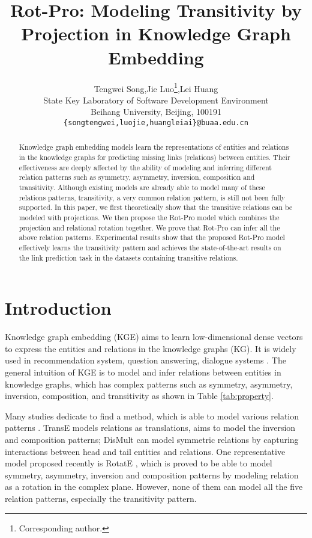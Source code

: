 \documentclass{article}
\title{Rot-Pro: Modeling Transitivity by Projection in Knowledge Graph Embedding}
\author{
  Tengwei Song,\quad Jie Luo\thanks{Corresponding author.},\quad Lei Huang\\
  State Key Laboratory of Software Development Environment \\
  Beihang University, Beijing, 100191 \\
  \texttt{\{songtengwei,luojie,huangleiai\}@buaa.edu.cn}
}
\begin{document}
\maketitle

\begin{abstract}
Knowledge graph embedding models learn the representations of entities and relations in the knowledge graphs for predicting missing links (relations) between entities. Their effectiveness are deeply affected by the ability of modeling and inferring different relation patterns such as symmetry, asymmetry, inversion, composition and transitivity.
Although existing models are already able to model many of these relations patterns, transitivity, a very common relation pattern, is still not been fully supported.
In this paper, we first theoretically show that the transitive relations can be modeled with projections. We then propose the Rot-Pro model which combines the projection and relational rotation together. We prove that Rot-Pro can infer all the above relation patterns.
Experimental results show that the proposed Rot-Pro model  effectively learns the transitivity pattern and achieves the state-of-the-art results on the link prediction task in the datasets containing transitive relations.
\end{abstract}

\section{Introduction}

Knowledge graph embedding (KGE) aims to learn low-dimensional dense vectors to express the entities and relations in the knowledge graphs (KG). It is widely used in recommendation system, question answering, dialogue systems \cite{qa1,qa2,qa3}.
The general intuition of KGE is to model and infer relations between entities in knowledge graphs, which has complex patterns such as symmetry, asymmetry, inversion, composition, and transitivity as shown in Table \ref{tab:property}.

Many studies dedicate to find a method, which is able to model various relation patterns \cite{transe,distmult,CompLex,rotate}. TransE models relations as translations, aims to model the inversion and composition patterns; DisMult can model symmetric relations by capturing interactions between head and tail entities and relations. One representative model proposed recently is RotatE \citep{rotate}, which is proved to be able to model symmetry, asymmetry, inversion and composition patterns by modeling relation as a rotation in the complex plane. However, none of them can model all the five relation patterns, especially the transitivity pattern.
\end{document}
